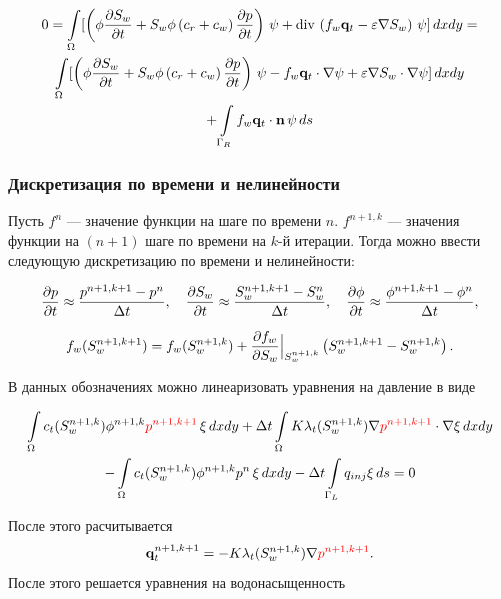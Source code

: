 \begin{multline}
	\displaystyle 0=\int\limits_\Omega  [\left(\phi \dfrac{\partial S_w}{\partial t} + S_w\phi\left(c_r + c_w \right)\dfrac{\partial p}{\partial t} \right)\,\psi + \operatorname{div}\, \left( f_w \mathbf{q}_t - \varepsilon \nabla S_w \right)\, \psi] \,dx dy = \\ 
	\int\limits_\Omega[\left(\phi \dfrac{\partial S_w}{\partial t} + S_w\phi\left(c_r + c_w \right)\dfrac{\partial p}{\partial t} \right)\,\psi -  f_w \mathbf{q}_t \cdot \nabla \psi +  \varepsilon \nabla S_w \cdot \nabla \psi] \,dx dy \\
	+\int\limits_{\Gamma_R} f_w \mathbf{q}_t \cdot \mathbf{n} \,\psi \, ds
\end{multline}

\subsubsection{Дискретизация по времени и нелинейности}

Пусть $f^{n}$ --- значение функции на шаге по времени $n$. $f^{n+1,k}$ --- значения функции на $(n+1)$ шаге по времени на $k$-й итерации. Тогда можно ввести следующую дискретизацию по времени и нелинейности:

\begin{equation}
	\dfrac{\partial p}{\partial t} \approx \dfrac{p^{n+1, k+1}-p^{n}}{\Delta t}, \quad \dfrac{\partial S_w}{\partial t} \approx \dfrac{S_w^{n+1, k+1}-S_w^{n}}{\Delta t}, \quad \dfrac{\partial \phi}{\partial t} \approx \dfrac{\phi^{n+1, k+1}-\phi^{n}}{\Delta t},
\end{equation}

\begin{equation}
	f_w(S_w^{n+1, k+1}) = f_w(S_w^{n+1, k}) + \dfrac{\partial f_w}{\partial S_w}\Bigl|_{S_w^{n+1, k}}\Bigr. \left( S_w^{n+1, k+1} - S_w^{n+1, k} \right) .
\end{equation}

В данных обозначениях можно линеаризовать уравнения на давление в виде

\begin{multline}
	 \int\limits_\Omega c_t (S_w^{n+1, k})\phi^{n+1, k} {\color{red}p^{n+1, k+1}}\, \xi \,dx dy 
	 + \Delta t \int\limits_\Omega K \lambda_t (S_w^{n+1, k}) \nabla {\color{red}p^{n+1, k+1} }\cdot \nabla\xi \,dx dy \\ -\int\limits_\Omega c_t (S_w^{n+1, k})\phi^{n+1, k} p^{n}\, \xi \,dx dy-\Delta t \int\limits_{\Gamma_L} q_{inj} \xi \, ds=0
\end{multline}

После этого расчитывается 
\begin{equation}
	\mathbf{q}_t^{n+1, k+1} = -K\lambda_t (S_w^{n+1,k})\nabla {\color{red}p^{n+1, k+1} }.
\end{equation}
После этого решается уравнения на водонасыщенность

